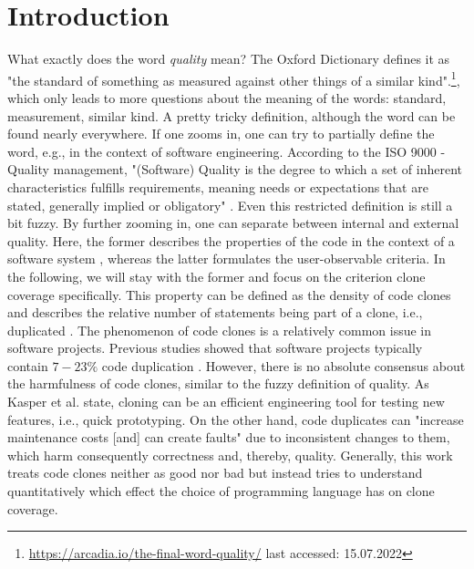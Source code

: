 
\section{Introduction}
\label{sec:intro}

What exactly does the word \textit{quality} mean? The Oxford Dictionary defines it as "the standard of something as measured against other things of a similar kind".\footnote{\url{https://arcadia.io/the-final-word-quality/} last accessed: 15.07.2022}, which only leads to more questions about the meaning of the words: standard, measurement, similar kind. A pretty tricky definition, although the word can be found nearly everywhere.
If one zooms in, one can try to partially define the word, e.g., in the context of software engineering. According to the ISO 9000 - Quality management, "(Software) Quality is the degree to which a set of inherent characteristics fulfills requirements, meaning needs or expectations that are stated, generally implied or obligatory" \cite{matthes2020ase}.
Even this restricted definition is still a bit fuzzy. By further zooming in, one can separate between internal and external quality. Here, the former describes the properties of the code in the context of a software system \cite{pretschner2022requirements}, whereas the latter formulates the user-observable criteria.
In the following, we will stay with the former and focus on the criterion clone coverage specifically.
This property can be defined as the density of code clones and describes the relative number of statements being part of a clone, i.e., duplicated \cite{knilling2020priorisierung}.
The phenomenon of code clones is a relatively common issue in software projects. Previous studies showed that software projects typically contain $7 -23\%$ code duplication \cite{koschke2007survey}.
However, there is no absolute consensus about the harmfulness of code clones, similar to the fuzzy definition of quality. As Kasper et al. \cite{kasper2006cloning} state, cloning can be an efficient engineering tool for testing new features, i.e., quick prototyping.
On the other hand, code duplicates can "increase maintenance costs [and] can create faults" \cite{juergens2009code} due to inconsistent changes to them, which harm consequently correctness and, thereby, quality. Generally, this work treats code clones neither as good nor bad but instead tries to understand quantitatively which effect the choice of programming language has on clone coverage.